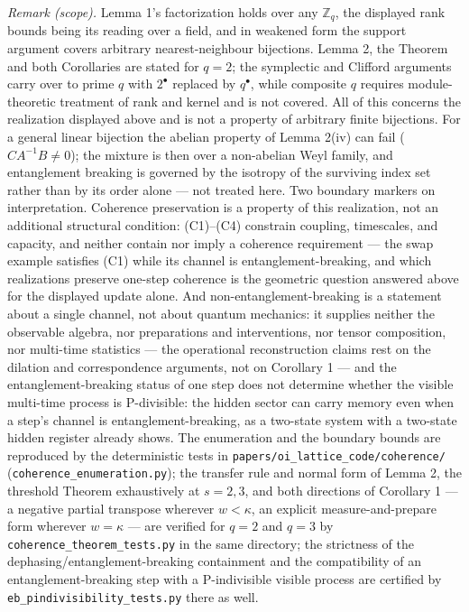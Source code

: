 \documentclass[
]{article}
\begin{document}
\emph{Remark (scope).} Lemma 1's factorization holds over any
\(\mathbb{Z}_q\), the displayed rank bounds being its reading over a
field, and in weakened form the support argument covers arbitrary
nearest-neighbour bijections. Lemma 2, the Theorem and both Corollaries
are stated for \(q = 2\); the symplectic and Clifford arguments carry
over to prime \(q\) with \(2^{\bullet}\) replaced by \(q^{\bullet}\),
while composite \(q\) requires module-theoretic treatment of rank and
kernel and is not covered. All of this concerns the realization
displayed above and is not a property of arbitrary finite bijections.
For a general linear bijection the abelian property of Lemma 2(iv) can
fail (\(C A^{-1} B \neq 0\)); the mixture is then over a non-abelian
Weyl family, and entanglement breaking is governed by the isotropy of
the surviving index set rather than by its order alone --- not treated
here. Two boundary markers on interpretation. Coherence preservation is
a property of this realization, not an additional structural condition:
(C1)--(C4) constrain coupling, timescales, and capacity, and neither
contain nor imply a coherence requirement --- the swap example satisfies
(C1) while its channel is entanglement-breaking, and which realizations
preserve one-step coherence is the geometric question answered above for
the displayed update alone. And non-entanglement-breaking is a statement
about a single channel, not about quantum mechanics: it supplies neither
the observable algebra, nor preparations and interventions, nor tensor
composition, nor multi-time statistics --- the operational
reconstruction claims rest on the dilation and correspondence arguments,
not on Corollary 1 --- and the entanglement-breaking status of one step
does not determine whether the visible multi-time process is
P-divisible: the hidden sector can carry memory even when a step's
channel is entanglement-breaking, as a two-state system with a two-state
hidden register already shows. The enumeration and the boundary bounds
are reproduced by the deterministic tests in
\texttt{papers/oi\_lattice\_code/coherence/}
(\texttt{coherence\_enumeration.py}); the transfer rule and normal form
of Lemma 2, the threshold Theorem exhaustively at \(s = 2, 3\), and both
directions of Corollary 1 --- a negative partial transpose wherever
\(w < \kappa\), an explicit measure-and-prepare form wherever
\(w = \kappa\) --- are verified for \(q = 2\) and \(q = 3\) by
\texttt{coherence\_theorem\_tests.py} in the same directory; the
strictness of the dephasing/entanglement-breaking containment and the
compatibility of an entanglement-breaking step with a P-indivisible
visible process are certified by \texttt{eb\_pindivisibility\_tests.py}
there as well.
\end{document}
